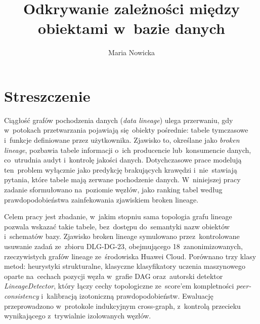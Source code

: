 \documentclass[polish,master,a4paper,oneside]{ppfcmthesis}
\author{Maria Nowicka \album{151851}}
\title{Odkrywanie zależności między obiektami w~bazie danych}
\renewcommand{\_}{\origtextunderscore\ifmmode\else\allowbreak\fi}
\begin{document}
\frontmatter*\pagestyle{empty}%
\maketitle\cleardoublepage%

\thispagestyle{empty}\null\cleardoublepage%

\chapter*{Streszczenie}

Ciągłość grafów pochodzenia danych (\emph{data lineage}) ulega przerwaniu,
gdy w~potokach przetwarzania pojawiają się~obiekty pośrednie: tabele
tymczasowe i~funkcje definiowane przez użytkownika. Zjawisko to, określane
jako \emph{broken lineage}, pozbawia tabele informacji o~ich producencie
lub~konsumencie danych, co~utrudnia audyt i~kontrolę jakości danych.
Dotychczasowe prace modelują ten~problem wyłącznie jako predykcję brakujących
krawędzi i~nie~stawiają pytania, które tabele mają zerwane pochodzenie
danych. W~niniejszej pracy zadanie sformułowano na~poziomie węzłów,
jako ranking tabel według prawdopodobieństwa zainfekowania zjawiskiem
broken lineage.

Celem pracy jest zbadanie, w~jakim stopniu sama topologia grafu lineage
pozwala wskazać takie tabele, bez~dostępu do~semantyki nazw obiektów
i~schematów bazy. Zjawisko broken lineage symulowano przez~kontrolowane
usuwanie zadań ze~zbioru DLG-DG-23, obejmującego 18~zanonimizowanych,
rzeczywistych grafów lineage ze~środowiska Huawei Cloud. Porównano trzy klasy
metod: heurystyki strukturalne, klasyczne klasyfikatory uczenia maszynowego
oparte na~cechach pozycji węzła w~grafie DAG oraz~autorski detektor
\emph{LineageDetector}, który łączy cechy topologiczne ze~score'em kompletności
\emph{peer-consistency} i~kalibracją izotoniczną prawdopodobieństw.
Ewaluację przeprowadzono w~protokole indukcyjnym cross-graph, z~kontrolą
przecieku wynikającego z~trywialnie izolowanych węzłów.
\end{document}
